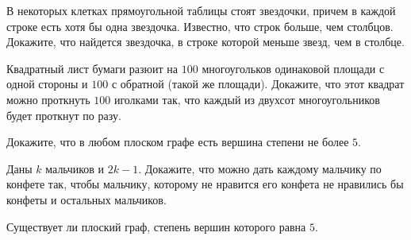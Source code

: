 \setcounter{curtask}{39}


\begin{task}
    В некоторых клетках прямоугольной таблицы стоят звездочки, причем в каждой строке
    есть хотя бы одна звездочка. Известно, что строк больше, чем столбцов. Докажите,
    что найдется звездочка, в строке которой меньше звезд, чем в столбце.
\end{task}

\begin{task}
    Квадратный лист бумаги разюит на $100$ многоугольков одинаковой площади с одной
    стороны и $100$ с обратной (такой же площади). Докажите, что этот квадрат можно
    проткнуть $100$ иголками так, что каждый из двухсот многоугольников будет
    проткнут по разу.
\end{task}

\begin{task}
    Докажите, что в любом плоском графе есть вершина степени не более $5$.
\end{task}

\begin{task}
    Даны $k$ мальчиков и $2k - 1$. Докажите, что можно дать каждому мальчику по
    конфете так, чтобы мальчику, которому не нравится его конфета не нравились бы
    конфеты и остальных мальчиков.
\end{task}

\begin{task}
    Существует ли плоский граф, степень вершин которого равна $5$.
\end{task}

